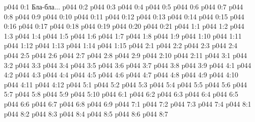 \author{Архангел}
\vs p044 0:1  Бла-бла...
\vs p044 0:2 
\vs p044 0:3 \pc 
\vs p044 0:4 
\vs p044 0:5 
\vs p044 0:6 
\vs p044 0:7 
\vs p044 0:8 
\vs p044 0:9 
\vs p044 0:10 
\vs p044 0:11 
\vs p044 0:12 
\vs p044 0:13 \pc 
\vs p044 0:14 
\vs p044 0:15 \pc 
\vs p044 0:16 
\vs p044 0:17 
\vs p044 0:18 
\vs p044 0:19 
\vs p044 0:20 
\vs p044 0:21 \pc 
{}
\vs p044 1:1 
\vs p044 1:2 
\vs p044 1:3 
\vs p044 1:4 
\vs p044 1:5 
\vs p044 1:6 
\vs p044 1:7 
\vs p044 1:8 
\vs p044 1:9 
\vs p044 1:10 \pc 
\vs p044 1:11 
\vs p044 1:12 \pc 
\vs p044 1:13 
\vs p044 1:14 \pc 
\vs p044 1:15 
\vs p044 2:1 
\vs p044 2:2 \pc 
\vs p044 2:3 
\vs p044 2:4 
\vs p044 2:5 
\vs p044 2:6 
\vs p044 2:7 
\vs p044 2:8 
\vs p044 2:9 
\vs p044 2:10 \pc 
\vs p044 2:11 
\vs p044 3:1 
\vs p044 3:2 
\vs p044 3:3 
\vs p044 3:4 
\vs p044 3:5 
\vs p044 3:6 
\vs p044 3:7 
\vs p044 3:8 
\vs p044 3:9 
\vs p044 4:1 
\vs p044 4:2 
\vs p044 4:3 
\vs p044 4:4 
\vs p044 4:5 
\vs p044 4:6 
\vs p044 4:7 
\vs p044 4:8 
\vs p044 4:9 
\vs p044 4:10 
\vs p044 4:11 
\vs p044 4:12 
\vs p044 5:1 
\vs p044 5:2 
\vs p044 5:3 
\vs p044 5:4 
\vs p044 5:5 
\vs p044 5:6 
\vs p044 5:7 
\vs p044 5:8 
\vs p044 5:9 
\vs p044 5:10 
\vs p044 6:1 
\vs p044 6:2 
\vs p044 6:3 
\vs p044 6:4 
\vs p044 6:5 
\vs p044 6:6 
\vs p044 6:7 
\vs p044 6:8 
\vs p044 6:9 
\vs p044 7:1 
\vs p044 7:2 
\vs p044 7:3 
\vs p044 7:4 
\vs p044 8:1 
\vs p044 8:2 
\vs p044 8:3 \pc 
\vs p044 8:4 
\vs p044 8:5 
\vs p044 8:6 \pc 
\vsetoff
\vs p044 8:7 
\quizlink
